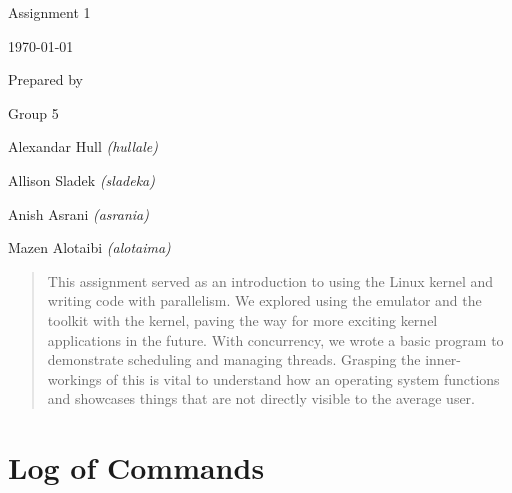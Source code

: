 \documentclass[onecolumn, draftclsnofoot,10pt, compsoc]{IEEEtran}
\def \CapstoneTeamNumber{		5}
\def \GroupMemberOne{			Alexandar Hull \textit{(hullale)}}
\def \GroupMemberTwo{			Allison Sladek \textit{(sladeka)}}
\def \GroupMemberThree{			Anish Asrani \textit{(asrania)}}
\def \GroupMemberFour{			Mazen Alotaibi \textit{(alotaima)}}
\def \DocType{ Assignment 1}
\newcommand{\NameSigPair}[1]{\par
\makebox[2.75in][r]{#1} \hfil 	\makebox[3.25in]{\makebox[2.25in]{\hrulefill} \hfill		\makebox[.75in]{\hrulefill}}
\par\vspace{-12pt} \textit{\tiny\noindent
\makebox[2.75in]{} \hfil		\makebox[3.25in]{\makebox[2.25in][r]{Signature} \hfill	\makebox[.75in][r]{Date}}}}
\renewcommand{\NameSigPair}[1]{#1}
\begin{document}
\begin{titlepage}
    \begin{singlespace}
        \hfill 
        \par\vspace{.2in}
        \centering
        \scshape{
            \huge \DocType \par
            {\large\today}\par
            \vspace{.5in}
           \vfill
            \vspace{5pt}
            {\large Prepared by }\par
            Group\CapstoneTeamNumber\par
            \vspace{5pt}
            {\Large
                \NameSigPair{\GroupMemberOne}\par
                \NameSigPair{\GroupMemberTwo}\par
                \NameSigPair{\GroupMemberThree}\par
                \NameSigPair{\GroupMemberFour}\par
            }
            \vspace{20pt}
        }
        \begin{abstract}
        This assignment served as an introduction to using the Linux kernel and writing code with parallelism. We explored using the emulator and the toolkit with the kernel, paving the way for more exciting kernel applications in the future.
        With concurrency, we wrote a basic program to demonstrate scheduling and managing threads. Grasping the inner-workings of this is vital to understand how an operating system functions and showcases things that are not directly visible to the average user. 
        
        
        \end{abstract}     
    \end{singlespace}
\end{titlepage}
\newpage
{}
\tableofcontents
\clearpage

\section{Log of Commands}
\end{document}
